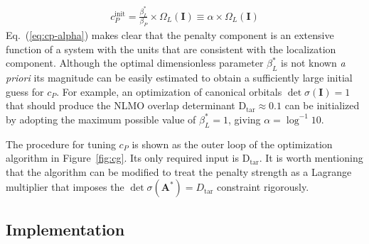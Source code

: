 \documentclass[aps,prl,reprint,amsmath,amssymb]{revtex4-1}
\begin{document}
%
\begin{equation} \label{eq:cp-alpha}
\begin{split}
c_{P}^{\text{init}} = \frac{ \beta_L^{\ast} }{ \beta_P } \times \Omega_L(\mathbf{I}) \equiv \alpha \times \Omega_L(\mathbf{I})
\end{split}
\end{equation}
%
Eq.~(\ref{eq:cp-alpha}) makes clear that the penalty component is an extensive function of a system with the units that are consistent with the localization component. Although the optimal dimensionless parameter $\beta_L^{\ast}$ is not known \emph{a priori} its magnitude can be easily estimated to obtain a sufficiently large initial guess for $c_P$. For example, an optimization of canonical orbitals $\det \sigma(\mathbf{I})=1$ that should produce the NLMO overlap determinant $\text{D}_{\text{tar}} \approx 0.1$ can be initialized by adopting the maximum possible value of $\beta_L^{\ast} = 1$, giving $\alpha = \log^{-1} 10$.

The procedure for tuning $c_P$ is shown as the outer loop of the optimization algorithm in Figure~\ref{fig:cg}. Its only required input is $\text{D}_{\text{tar}}$. It is worth mentioning that the algorithm can be modified to treat the penalty strength as a Lagrange multiplier that imposes the $\det \sigma (\mathbf{A}^{\ast}) = D_{\text{tar}}$ constraint rigorously. 

\subsection{Implementation} 
\end{document}
